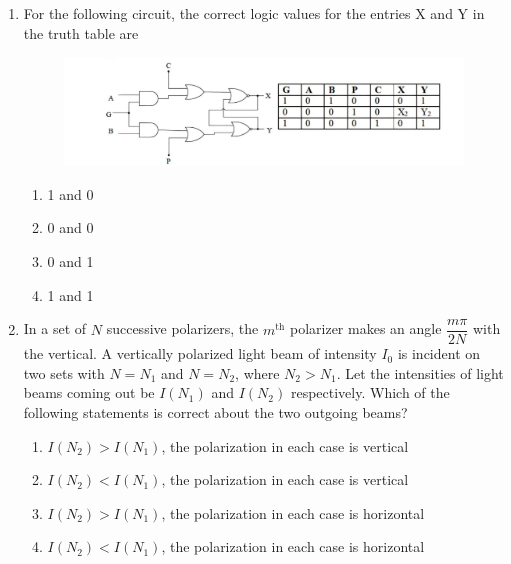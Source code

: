 \documentclass[journal,12pt,onecolumn]{IEEEtran}
\begin{document}
\begin{enumerate}[itemsep=0.45cm]
\newpage

\item For the following circuit, the correct logic values for the entries X and Y in the truth table are

\begin{figure}[ht!]
    \centering
    \includegraphics[width=1.1\textwidth]{fig8.jpeg}
    \caption{}
    \label{fig:fig8.jpeg}
\end{figure}

\hfill{}

\begin{multicols}{4}
    \begin{enumerate}
        \item 1 and 0
        \item 0 and 0
        \item 0 and 1
        \item 1 and 1
    \end{enumerate}
    \end{multicols}


\item In a set of $N$ successive polarizers, the $m^{\text{th}}$ polarizer makes an angle 
    $\dfrac{m\pi}{2N}$ with the vertical. A vertically polarized light beam of intensity $I_{0}$ 
    is incident on two sets with $N = N_{1}$ and $N = N_{2}$, where $N_{2} > N_{1}$. Let the 
    intensities of light beams coming out be $I(N_{1})$ and $I(N_{2})$ respectively. Which of the 
    following statements is correct about the two outgoing beams?

\hfill{}
    
    \begin{enumerate}
        \item $I(N_{2}) > I(N_{1})$, the polarization in each case is vertical
        \item $I(N_{2}) < I(N_{1})$, the polarization in each case is vertical
        \item $I(N_{2}) > I(N_{1})$, the polarization in each case is horizontal
        \item $I(N_{2}) < I(N_{1})$, the polarization in each case is horizontal
    \end{enumerate}


\end{enumerate}
\end{document}
